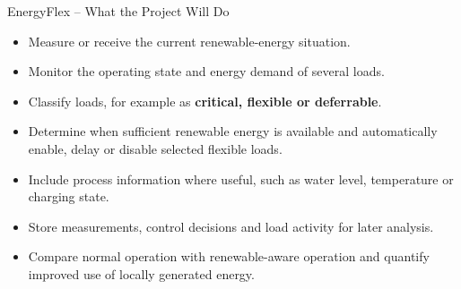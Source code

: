 \begin{frame}{EnergyFlex -- What the Project Will Do}
\small
\begin{itemize}
    \item Measure or receive the current renewable-energy situation.
    \item Monitor the operating state and energy demand of several loads.
    \item Classify loads, for example as \textbf{critical, flexible or deferrable}.
    \item Determine when sufficient renewable energy is available and automatically enable, delay or disable selected flexible loads.
    \item Include process information where useful, such as water level, temperature or charging state.
    \item Store measurements, control decisions and load activity for later analysis.
    \item Compare normal operation with renewable-aware operation and quantify improved use of locally generated energy.
\end{itemize}
\end{frame}
